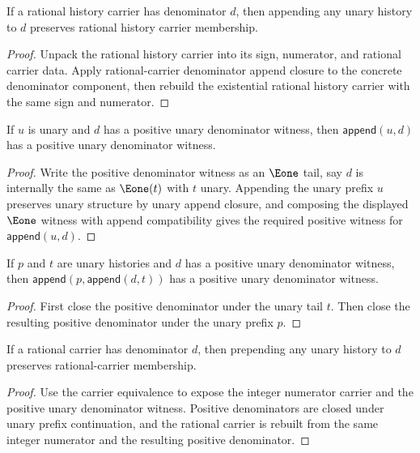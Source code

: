 \begin{theorem}
\label{thm:rat-history-carrier-append-unary-denominator-closed}
If a rational history carrier has denominator $d$, then appending any unary history to $d$ preserves rational history carrier membership.
\end{theorem}
\begin{proof}
Unpack the rational history carrier into its sign, numerator, and rational carrier data. Apply rational-carrier denominator append closure to the concrete denominator component, then rebuild the existential rational history carrier with the same sign and numerator.
\end{proof}

\begin{theorem}
\label{thm:rat-positive-denominator-append-unary-prefix}
If $u$ is unary and $d$ has a positive unary denominator witness, then
$\mathsf{append}(u,d)$ has a positive unary denominator witness.
\end{theorem}
\begin{proof}
Write the positive denominator witness as an $\Eone$ tail, say $d$ is
internally the same as $\Eone(t)$ with $t$ unary. Appending the unary prefix
$u$ preserves unary structure by unary append closure, and composing the
displayed $\Eone$ witness with append compatibility gives the required
positive witness for $\mathsf{append}(u,d)$.
\end{proof}

\begin{theorem}
\label{thm:rat-positive-denominator-append-unary-context}
If $p$ and $t$ are unary histories and $d$ has a positive unary denominator
witness, then $\mathsf{append}(p,\mathsf{append}(d,t))$ has a positive unary
denominator witness.
\end{theorem}
\begin{proof}
First close the positive denominator under the unary tail $t$. Then close the
resulting positive denominator under the unary prefix $p$.
\end{proof}

\begin{theorem}
\label{thm:rat-carrier-prepend-unary-denominator-closed}
If a rational carrier has denominator $d$, then prepending any unary history
to $d$ preserves rational-carrier membership.
\end{theorem}
\begin{proof}
Use the carrier equivalence to expose the integer numerator carrier and the
positive unary denominator witness. Positive denominators are closed under
unary prefix continuation, and the rational carrier is rebuilt from the same
integer numerator and the resulting positive denominator.
\end{proof}

